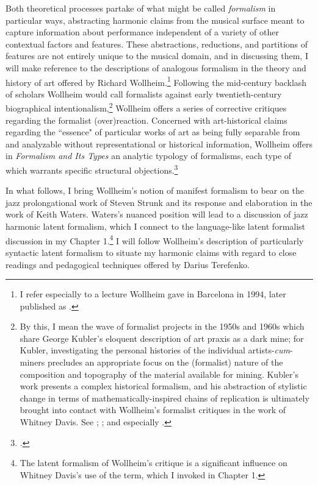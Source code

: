 Both theoretical processes partake of what might be called \emph{formalism} in particular ways, abstracting harmonic claims from the musical surface meant to capture information about performance independent of a variety of other contextual factors and features.  These abstractions, reductions, and partitions of features are not entirely unique to the musical domain, and in discussing them, I will make reference to the descriptions of analogous formalism in the theory and history of art offered by Richard Wollheim.\footnote{I refer especially to a lecture Wollheim gave in Barcelona in 1994, later published as \cite{wollheim1995}.}  Following the mid-century backlash of scholars Wollheim would call formalists against early twentieth-century biographical intentionalism,\footnote{By this, I mean the wave of formalist projects in the 1950s and 1960s which share George Kubler's eloquent description of art praxis as a dark mine; for Kubler, investigating the personal histories of the individual artists-\emph{cum}-miners precludes an appropriate focus on the (formalist) nature of the composition and topography of the material available for mining.  Kubler's work presents a complex historical formalism, and his abstraction of stylistic change in terms of mathematically-inspired chains of replication is ultimately brought into contact with Wollheim's formalist critiques in the work of Whitney Davis.  See \cite{kubler1962}; \cite{davis2010queer}; and especially \cite{davis2011}.}  Wollheim offers a series of corrective critiques regarding the formalist (over)reaction.  Concerned with art-historical claims regarding the ``essence" of particular works of art as being fully separable from and analyzable without representational or historical information, Wollheim offers in \emph{Formalism and Its Types} an analytic typology of formalisms, each type of which warrants specific structural objections.\footnote{\cite{wollheim1995}.}

In what follows, I bring Wollheim's notion of manifest formalism to bear on the jazz prolongational work of Steven Strunk and its response and elaboration in the work of Keith Waters.  Waters's nuanced position will lead to a discussion of jazz harmonic latent formalism, which I connect to the language-like latent formalist discussion in my Chapter 1.\footnote{The latent formalism of Wollheim's critique is a significant influence on Whitney Davis's use of the term, which I invoked in Chapter 1.}  I will follow Wollheim's description of particularly syntactic latent formalism to situate my harmonic claims with regard to close readings and pedagogical techniques offered by Darius Terefenko.

